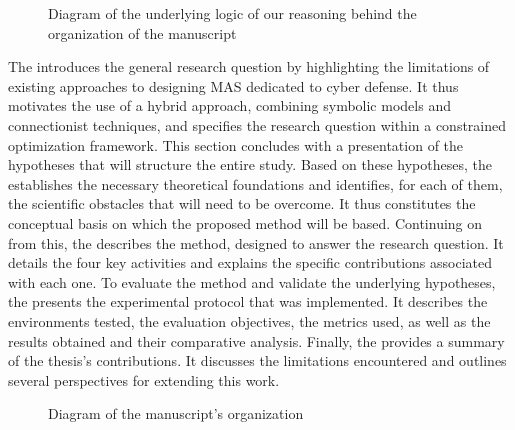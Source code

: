 \begin{figure}[h!]
  \centering
  \resizebox{0.8\textwidth}{!}{%
    
  }
  \caption{Diagram of the underlying logic of our reasoning behind the organization of the manuscript}
  \label{fig:manuscript_logic}
\end{figure}
\noindent
The  introduces the general research question by highlighting the limitations of existing approaches to designing MAS dedicated to cyber defense. It thus motivates the use of a hybrid approach, combining symbolic models and connectionist techniques, and specifies the research question within a constrained optimization framework. This section concludes with a presentation of the hypotheses that will structure the entire study.
%
Based on these hypotheses, the  establishes the necessary theoretical foundations and identifies, for each of them, the scientific obstacles that will need to be overcome. It thus constitutes the conceptual basis on which the proposed method will be based.
%
Continuing on from this, the  describes the  method, designed to answer the research question. It details the four key activities and explains the specific contributions associated with each one.
%
To evaluate the method and validate the underlying hypotheses, the  presents the experimental protocol that was implemented. It describes the environments tested, the evaluation objectives, the metrics used, as well as the results obtained and their comparative analysis.
%
Finally, the  provides a summary of the thesis's contributions. It discusses the limitations encountered and outlines several perspectives for extending this work.
\begin{figure}[h!]
  \centering
  \resizebox{\textwidth}{!}{%
    
  }
  \caption{Diagram of the manuscript's organization}
  \label{fig:manuscript_organization}
\end{figure}
\cleardoublepage
